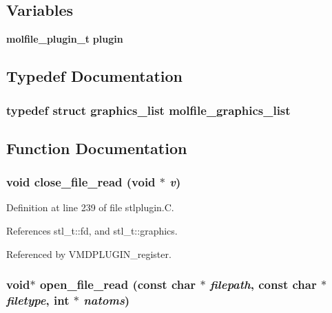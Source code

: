 \subsection*{Variables}
\begin{CompactItemize}
\item 
{\bf molfile\_\-plugin\_\-t} {\bf plugin}
\end{CompactItemize}


\subsection{Typedef Documentation}
\subsubsection{\setlength{\rightskip}{0pt plus 5cm}typedef struct {\bf graphics\_\-list}  molfile\_\-graphics\_\-list}\label{stlplugin_8C_a0}




\subsection{Function Documentation}
\subsubsection{\setlength{\rightskip}{0pt plus 5cm}void close\_\-file\_\-read (void $\ast$ {\em v})\hspace{0.3cm}{\tt  [static]}}\label{stlplugin_8C_a4}




Definition at line 239 of file stlplugin.C.

References stl\_\-t::fd, and stl\_\-t::graphics.

Referenced by VMDPLUGIN\_\-register.
\subsubsection{\setlength{\rightskip}{0pt plus 5cm}void$\ast$ open\_\-file\_\-read (const char $\ast$ {\em filepath}, const char $\ast$ {\em filetype}, int $\ast$ {\em natoms})\hspace{0.3cm}{\tt  [static]}}\label{stlplugin_8C_a2}




